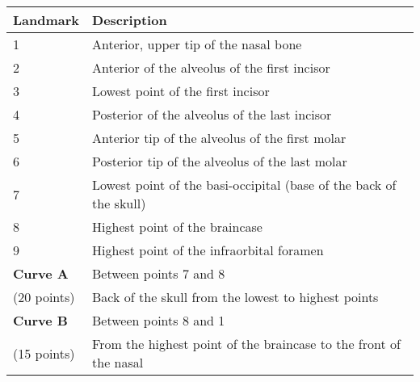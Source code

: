 \begin{tabular}[t]{l l}		
\hline
\textbf{Landmark} & \textbf{Description} \\
\hline
1 & Anterior, upper tip of the nasal bone\\
2 & Anterior of the alveolus of the first incisor\\
3 & Lowest point of the first incisor\\
4& Posterior of the alveolus of the last incisor \\
5 & Anterior tip of the alveolus of the first molar\\
6 & Posterior tip of the alveolus of the last molar\\
7 & Lowest point of the basi-occipital (base of the back of the skull)\\
8 & Highest point of the braincase\\
9 & Highest point of the infraorbital foramen\\
\hline
\textbf{Curve A} & Between points 7 and 8  \\
(20 points)& Back of the skull from the lowest to highest points\\
\textbf{Curve B} & Between points 8 and 1  \\
(15 points)&From the highest point of the braincase to the front of the nasal \\
\hline
\end{tabular}